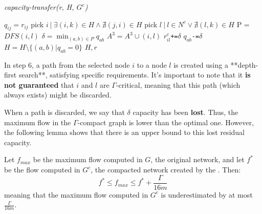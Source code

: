 \begin{algorithm}
    \caption{\textit{capacity-transfer(r, H, $G^c$)}}
    \label{algotrans}
    \begin{algorithmic}[1]
     
            \State $q_{ij} = r_{ij}$
        \EndFor
            \State pick $i\ |\ \exists (i,k)\in H \land\nexists (j,i) \in H$
            \State pick $l\ |\ l\in N^c \lor \nexists (l,k)\in H$
            \State P = $DFS(i, l)$ 
            \State \(\delta = \min_{(a,b)\in P}q_{ab}\)
                             \State $A^3 = A^3 \cup {(i,l)}$
                \State $r^c_{il} $\verb|+=|$ \delta$
            \EndIf
                \State  $q_{ab} $\verb|-=|$ \delta$
            \EndFor
            \State $H = H\setminus \{(a,b) | q_{ab} = 0\}$ 
        \EndWhile 
        \Return $H, r$ 
    \end{algorithmic}
\end{algorithm}

In step 6, a path from the selected node \( i \) to a node \( l \) is created using a **depth-first search**, satisfying specific requirements. It's important to note that it \textbf{is not guaranteed} that \( i \) and \( l \) are \(\Gamma\)-critical, meaning that this path (which always exists) might be discarded.

When a path is discarded, we say that \(\delta\) capacity has been \textbf{lost}. Thus, the maximum flow in the \(\Gamma\)-compact graph is lower than the optimal one. However, the following lemma shows that there is an upper bound to this lost residual capacity.

\begin{lemma} \label{boundlose}
    Let \( f_{max} \) be the maximum flow computed in \( G \), the original network, and let \( f^* \) be the flow computed in \( G^c \), the compacted network created by the .
    Then:
    \[
    f^* \leq f_{max} \leq f^* + \frac{\Gamma}{16m}
    \]
    meaning that the maximum flow computed in \( G^c \) is underestimated by at most \( \frac{\Gamma}{16m} \).
\end{lemma}

